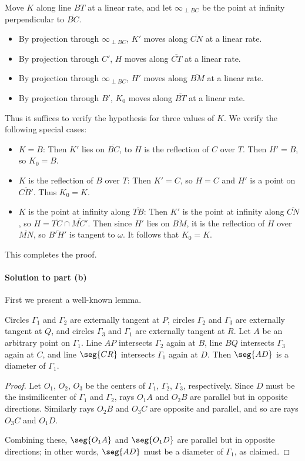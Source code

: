 Move $K$ along line $BT$ at a linear rate, and let $\infty_{\perp BC}$ be the point at infinity perpendicular to $\overline{BC}$.
\begin{itemize}[itemsep=0em]
    \item By projection through $\infty_{\perp BC}$, $K'$ moves along $\overline{CN}$ at a linear rate.
    \item By projection through $C'$, $H$ moves along $\overline{CT}$ at a linear rate.
    \item By projection through $\infty_{\perp BC}$, $H'$ moves along $\overline{BM}$ at a linear rate.
    \item By projection through $B'$, $K_0$ moves along $\overline{BT}$ at a linear rate.
\end{itemize}
Thus it suffices to verify the hypothesis for three values of $K$. We verify the following special cases:
\begin{itemize}[itemsep=0em]
    \item $K=B$: Then $K'$ lies on $\overline{BC}$, to $H$ is the reflection of $C$ over $T$. Then $H'=B$, so $K_0=B$.
    \item $K$ is the reflection of $B$ over $T$: Then $K'=C$, so $H=C$ and $H'$ is a point on $\overline{CB'}$. Thus $K_0=K$.
    \item $K$ is the point at infinity along $\overline{TB}$: Then $K'$ is the point at infinity along $\overline{CN}$, so $H=\overline{TC}\cap\overline{MC'}$. Then since $H'$ lies on $\overline{BM}$, it is the reflection of $H$ over $\overline{MN}$, so $\overline{B'H'}$ is tangent to $\omega$. It follows that $K_0=K$.
\end{itemize}
This completes the proof.

\paragraph{Solution to part (b)}     First we present a well-known lemma.
\begin{lemma*}[Folklore]
    Circles $\Gamma_1$ and $\Gamma_2$ are externally tangent at $P$, circles $\Gamma_2$ and $\Gamma_3$ are externally tangent at $Q$, and circles $\Gamma_3$ and $\Gamma_1$ are externally tangent at $R$. Let $A$ be an arbitrary point on $\Gamma_1$. Line $AP$ intersects $\Gamma_2$ again at $B$, line $BQ$ intersects $\Gamma_3$ again at $C$, and line $\seg{CR}$ intersects $\Gamma_1$ again at $D$. Then $\seg{AD}$ is a diameter of $\Gamma_1$.
\end{lemma*}
\begin{proof}
    Let $O_1$, $O_2$, $O_3$ be the centers of $\Gamma_1$, $\Gamma_2$, $\Gamma_3$, respectively. Since $D$ must be the insimilicenter of $\Gamma_1$ and $\Gamma_2$, rays $O_1A$ and $O_2B$ are parallel but in opposite directions. Similarly rays $O_2B$ and $O_3C$ are opposite and parallel, and so are rays $O_3C$ and $O_1D$.

    Combining these, $\seg{O_1A}$ and $\seg{O_1D}$ are parallel but in opposite directions; in other words, $\seg{AD}$ must be a diameter of $\Gamma_1$, as claimed.
\end{proof}

